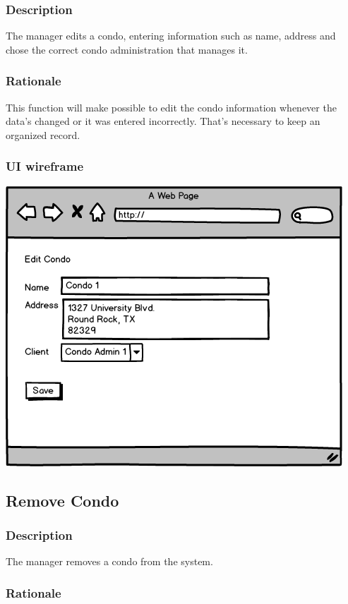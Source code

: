 \documentclass{scrreprt}
\begin{document}
\subsubsection{Description}

The manager edits a condo, entering information such as name, address and chose the correct condo administration that manages it.

\subsubsection{Rationale}

This function will make possible to edit the condo information whenever the data's changed or it was entered incorrectly. That's necessary to keep an organized record.

\subsubsection{UI wireframe}
\includegraphics[scale=0.60]{mockups/editcondo.png}

\subsection{Remove Condo}
\subsubsection{Description}

The manager removes a condo from the system.

\subsubsection{Rationale}
\end{document}
